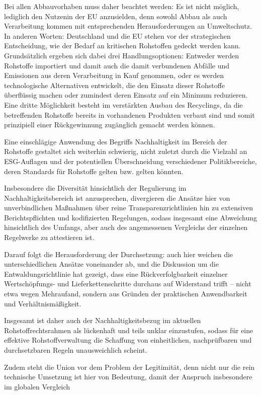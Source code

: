 \documentclass[12pt,a4paper,oneside]{book} %
\begin{document}
Bei allen Abbauvorhaben muss daher beachtet werden: Es ist nicht möglich, lediglich den \glqq Nutzen\grqq in der EU anzusielden, denn sowohl Abbau als auch Verarbeitung kommen mit entsprechenden Herausforderungen an Umweltschutz. In anderen Worten: Deutschland und die EU stehen vor der strategischen Entscheidung, wie der Bedarf an kritischen Rohstoffen gedeckt werden kann. Grundsätzlich ergeben sich dabei drei Handlungsoptionen: Entweder werden Rohstoffe importiert und damit auch die damit verbundenen Abfälle und Emissionen aus deren Verarbeitung in Kauf genommen, oder es werden technologische Alternativen entwickelt, die den Einsatz dieser Rohstoffe überflüssig machen oder zumindest deren Einsatz auf ein Minimum reduzieren. Eine dritte Möglichkeit besteht im verstärkten Ausbau des Recyclings, da die betreffenden Rohstoffe bereits in vorhandenen Produkten verbaut sind und somit prinzipiell einer Rückgewinnung zugänglich gemacht werden können.


Eine einschlägige Anwendung des Begriffs Nachhaltigkeit im Bereich der Rohstoffe gestaltet sich weiterhin schwierig, nicht zuletzt durch die Vielzahl an ESG-Auflagen und der potentiellen Überschneidung verschiedener Politikbereiche, deren Standards für Rohstoffe gelten bzw. gelten könnten.

Insbesondere die Diversität hinsichtlich der Regulierung im Nachhaltigkeitsbereich ist anzusprechen, divergieren die Ansätze hier von unverbindlichen Maßnahmen über reine Transparenzrichtlinien hin zu extensiven Berichtspflichten und kodifizierten Regelungen, sodass insgesamt eine Abweichung hinsichtlich des Umfangs, aber auch des angemessenen Vergleichs der einzelnen Regelwerke zu attestieren ist.

Darauf folgt die Herausforderung der Durchsetzung: auch hier weichen die unterschiedlichen Ansätze voneinander ab, und die Diskussion um die Entwaldungsrichtlinie hat gezeigt, dass eine Rückverfolgbarkeit einzelner Wertschöpfungs- und Lieferkettenschritte durchaus auf Widerstand trifft -- nicht etwa wegen Mehraufand, sondern aus Gründen der praktischen Anwendbarkeit und Verhältnismäßigkeit.

Insgesamt ist daher auch der Nachhaltigkeitsbezug im aktuellen Rohstoffrechtsrahmen als lückenhaft und teils unklar einzustufen, sodass für eine effektive Rohstoffverwaltung die Schaffung von einheitlichen, nachprüfbaren und durchsetzbaren Regeln unausweichlich scheint.

Zudem steht die Union vor dem Problem der Legitimität, denn nicht nur die rein technische Umsetzung ist hier von Bedeutung, damit der Anspruch insbesondere im globalen Vergleich 
\end{document}

